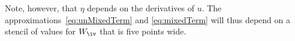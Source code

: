 Note, however, that $\eta$ depends on the derivatives of $u$.
The approximations~\eqref{eq:unMixedTerm} and \eqref{eq:mixedTerm} will thus depend on 
a stencil of values for $W_\iv$ that is five points wide.






